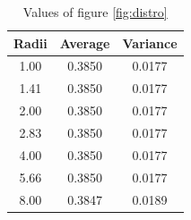 \documentclass[aps,pra,a4paper,nofootinbib,onecolumn,tightenlines,longbibliography,12pt,amsfonts,amssymb,amsmath,floatfix]{revtex4-2} %
\begin{document}
\begin{table}[H]
\begin{center}
\begin{tabular}{||c || c c||} 
 \hline
 Radii & Average & Variance \\ [0.5ex] 
 \hline\hline
 1.00 &  0.3850& 0.0177 \\ 
 \hline  
 1.41 &  0.3850& 0.0177  \\
 \hline 
 2.00 &  0.3850& 0.0177 \\
 \hline 
 2.83 &  0.3850& 0.0177 \\
 \hline 
 4.00 &  0.3850&  0.0177 \\ 
 \hline 
 5.66 &  0.3850& 0.0177 \\
 \hline
 8.00 &  0.3847& 0.0189\\ [1ex] 
 \hline
\end{tabular}
\end{center}
\caption{Values of figure \ref{fig:distro}}
\label{table1}
\end{table}

\end{document}
